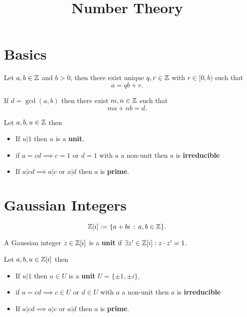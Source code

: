 \documentclass{article}
\title{Number Theory}
\begin{document}
\maketitle

\section*{Basics}
\begin{theorem}
Let $a,b\in\mathbb{Z}$ and $b>0$, then there exist unique $q,r\in\mathbb{Z}$ with $r\in[0,b)$ such that
    \[
    a = qb + r.
    \]
\end{theorem}

\begin{theorem}[Bezout]
If $d=\gcd(a,b)$ then there exist $m,n\in\mathbb{Z}$ such that
    \[
    ma + nb = d.
    \]
\end{theorem}

\begin{definition}
Let $a,b,u\in\mathbb{Z}$ then
    \begin{itemize}
        \item If $u|1$ then $u$ is a \textbf{unit},
        \item if $a=cd\implies c=1$ or $d=1$ with $a$ a non-unit then $a$ is \textbf{irreducible}
        \item If $a|cd\implies a|c$ or $a|d$ then $a$ is \textbf{prime}.
    \end{itemize}
\end{definition}


\section*{Gaussian Integers}
\begin{definition}
    \[
    \mathbb{Z}[i] := \{a+bi\,:\,a,b\in\mathbb{Z}\}.
    \]
\end{definition}

\begin{definition}
A Gaussian integer $z\in\mathbb{Z}[i]$ is a \textbf{unit} if $\exists z'\in\mathbb{Z}[i]: z\cdot z'=1$.
\end{definition}

\begin{definition}
Let $a,b,u\in\mathbb{Z}[i]$ then
    \begin{itemize}
        \item If $u|1$ then $u\in U$ is a \textbf{unit} $U=\{\pm1,\pm i\}$,
        \item if $a=cd\implies c\in U$ or $d\in U$ with $a$ a non-unit then $a$ is \textbf{irreducible}
        \item If $a|cd\implies a|c$ or $a|d$ then $a$ is \textbf{prime}.
    \end{itemize}
\end{definition}
\end{document}
